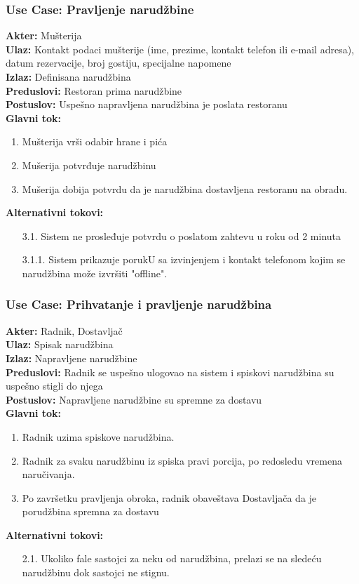 \documentclass{article}
\begin{document}
\subsubsection{\textbf{Use Case}: Pravljenje narudžbine}
\textbf{Akter:} Mušterija\\
\textbf{Ulaz:} Kontakt podaci mušterije (ime, prezime, kontakt telefon ili e-mail adresa), datum rezervacije, broj gostiju, specijalne napomene\\
\textbf{Izlaz:} Definisana narudžbina\\
\textbf{Preduslovi:} Restoran prima narudžbine\\
\textbf{Postuslov:} Uspešno napravljena narudžbina je poslata restoranu\\
\textbf{Glavni tok:}
\begin{enumerate}
\item Mušterija vrši odabir hrane i pića
\item Mušerija potvrđuje narudžbinu
\item Mušerija dobija potvrdu da je narudžbina dostavljena restoranu na obradu.\\
\end{enumerate}
\textbf{Alternativni tokovi:} \\
\begin{itemize}
\item [3.1.] Sistem ne prosleđuje potvrdu o poslatom zahtevu u roku od 2 minuta
\item [3.1.1.] Sistem prikazuje porukU sa izvinjenjem i kontakt telefonom kojim se narudžbina može izvršiti "offline".
\end{itemize}


\subsubsection{\textbf{Use Case}: Prihvatanje i pravljenje narudžbina}
\textbf{Akter:} Radnik, Dostavljač\\
\textbf{Ulaz:} Spisak narudžbina\\
\textbf{Izlaz:} Napravljene narudžbine\\
\textbf{Preduslovi:} Radnik se uspešno ulogovao na sistem i spiskovi narudžbina su uspešno stigli do njega\\
\textbf{Postuslov:}  Napravljene narudžbine su spremne za dostavu\\
\textbf{Glavni tok:}
\begin{enumerate}
\item Radnik uzima spiskove narudžbina.
\item Radnik za svaku narudžbinu iz spiska pravi porcija, po redosledu vremena naručivanja.
\item Po završetku pravljenja obroka, radnik obaveštava Dostavljača da je porudžbina spremna za dostavu 
\end{enumerate}
\textbf{Alternativni tokovi:}\\
\begin{itemize}
\item [2.1.] Ukoliko  fale sastojci za neku od narudžbina, prelazi se na sledeću narudžbinu dok sastojci ne stignu.
\end{itemize}
       
\end{document}
